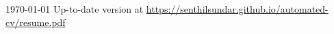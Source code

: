 \documentclass[11pt, a4paper]{awesome-cv}
\begin{document}
\makecvheader[C]

\makecvfooter
{\today}
{Up-to-date version at \upshape\color{text}\url{https://senthilsundar.github.io/automated-cv/resume.pdf}}
{\thepage}



\medskip
\vspace{0.5em}

\vspace{0.5em}

% 
\medskip

\end{document}
